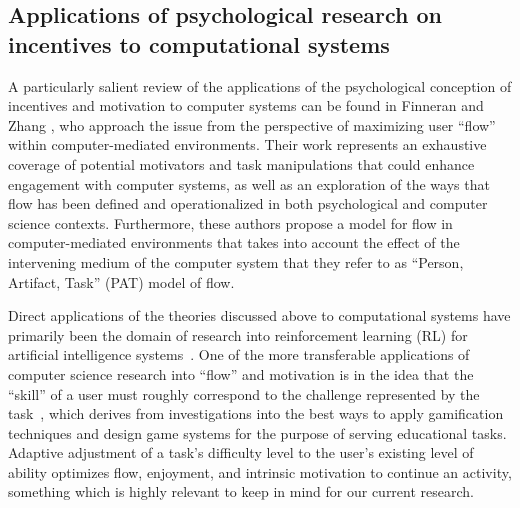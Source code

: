 \subsection{Applications of psychological research on incentives to computational systems}
A particularly salient review of the applications of the psychological conception of incentives and motivation to computer systems can be found in Finneran and Zhang \cite{Finneran05}, who approach the issue from the perspective of maximizing user “flow” within computer-mediated environments. Their work represents an exhaustive coverage of potential motivators and task manipulations that could enhance engagement with computer systems, as well as an exploration of the ways that flow has been defined and operationalized in both psychological and computer science contexts. Furthermore, these authors propose a model for flow in computer-mediated environments that takes into account the effect of the intervening medium of the computer system that they refer to as “Person, Artifact, Task” (PAT) model of flow.

Direct applications of the theories discussed above to computational systems have primarily been the domain of research into reinforcement learning (RL) for artificial intelligence systems~\cite{barto2004intrinsically, kiili2005digital,barto2005intrinsic}.
One of the more transferable applications of computer science research into “flow” and motivation is in the idea that the “skill” of a user must roughly correspond to the challenge represented by the task~\cite{barto2004intrinsically,barto2005intrinsic}, which derives from investigations into the best ways to apply gamification techniques and design game systems for the purpose of serving educational tasks. Adaptive adjustment of a task’s difficulty level to the user’s existing level of ability optimizes flow, enjoyment, and intrinsic motivation to continue an activity, something which is highly relevant to keep in mind for our current research.

